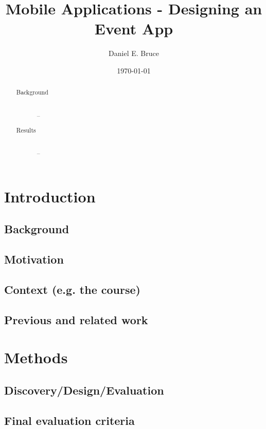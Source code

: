\documentclass[]{report}
\begin{document}
\title{Mobile Applications - Designing an Event App}
\author{Daniel E. Bruce}
\date{\today}
\maketitle

\begin{abstract}
  \begin{description}
    \item[Background] \hfill \\
      --
    \item[Results] \hfill \\
      --
  \end{description}
\end{abstract}

\tableofcontents

\chapter{Introduction}

\section{Background}

\section{Motivation}

\section{Context (e.g. the course)}

\section{Previous and related work}

\chapter{Methods}

\section{Discovery/Design/Evaluation}

\section{Final evaluation criteria}
\end{document}
